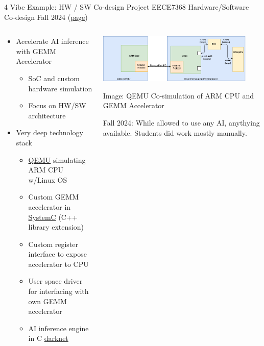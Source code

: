\documentclass[xcolor=dvipsnames, aspectratio=169]{beamer}
\begin{document}
\begin{frame}{4 Vibe Example: HW / SW Co-design Project} 
    \centering EECE7368 Hardware/Software Co-design Fall 2024 (\href{https://neu-ece-7368.github.io/}{page})   \begin{columns}[T]
    \begin{column}{0.4\textwidth}
      \begin{itemize}
        \item Accelerate AI inference with GEMM Accelerator 
        \begin{itemize}
          \item SoC and custom hardware simulation
          \item Focus on HW/SW architecture
        \end{itemize}
        \item Very deep technology stack
        \begin{itemize}\footnotesize
            \item \href{https://www.qemu.org/}{QEMU} simulating ARM CPU w/Linux OS
            \item Custom GEMM accelerator in \href{https://systemc.org/}{SystemC} (C++ library extension)
            \item Custom register interface to expose accelerator to CPU 
            \item User space driver for interfacing with own GEMM accelerator
            \item AI inference engine in C \href{https://github.com/pjreddie/darknet}{darknet}
          \end{itemize}
      \end{itemize}
    \end{column}
    \begin{column}{0.6\textwidth}
      \hfill \includegraphics[width=0.9\textwidth]{images/QemuCosim.png}
      \tiny\centerline{Image: QEMU Co-simulation of ARM CPU and GEMM Accelerator}

      \begin{alertbox}
        Fall 2024: While allowed to use any AI, anythying available. Students did work mostly manually. 
      \end{alertbox}
    \end{column}
  \end{columns}
\end{frame}
\end{document}
